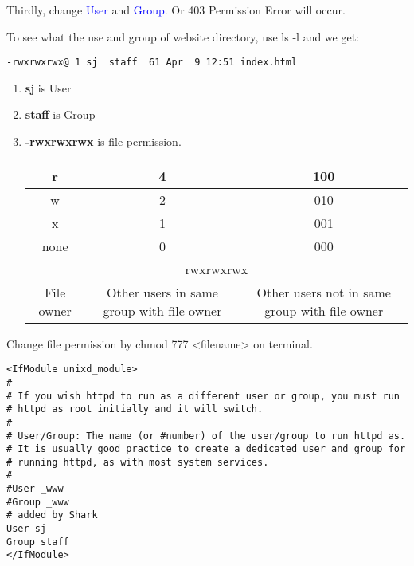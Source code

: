 Thirdly, change \textcolor{blue}{User} and \textcolor{blue}{Group}. Or 403 Permission Error will occur. \par
To see what the use and group of website directory, use \colorbox{gray!30}{ls -l} and we get: 
\begin{lstlisting}
-rwxrwxrwx@ 1 sj  staff  61 Apr  9 12:51 index.html
\end{lstlisting}
\begin{enumerate}
\item \textbf{sj} is User
\item \textbf{staff} is Group
\item \textbf{-rwxrwxrwx} is file permission. 
\begin{table}[H]
\begin{tabular}{|c|c|c|}
\hline
r & 4 & 100 \\
\hline
w & 2 & 010 \\
\hline
x & 1 & 001 \\
\hline
none & 0 & 000 \\
\hline
\multicolumn{3}{|c|}{rwxrwxrwx} \\
\hline
File owner & Other users in same group with file owner & Other users not in same group with file owner  \\
\hline
\end{tabular}
\end{table}
\end{enumerate}
Change file permission by \colorbox{gray!30}{chmod 777 <filename>} on terminal.
\begin{lstlisting}
<IfModule unixd_module>
#
# If you wish httpd to run as a different user or group, you must run
# httpd as root initially and it will switch.
#
# User/Group: The name (or #number) of the user/group to run httpd as.
# It is usually good practice to create a dedicated user and group for
# running httpd, as with most system services.
#
#User _www
#Group _www
# added by Shark
User sj
Group staff
</IfModule>
\end{lstlisting}

